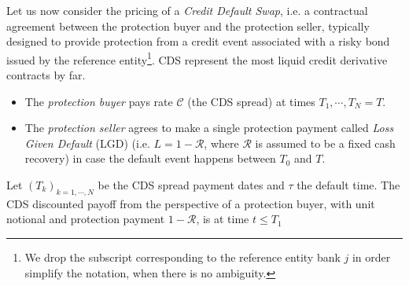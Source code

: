 \documentclass[12pt,a4paper]{article}
\theoremstyle{plain}
\numberwithin{equation}{section}
\begin{document}
Let us now consider the pricing of a  \emph{Credit Default Swap}, i.e.  a contractual agreement between the protection buyer and the protection seller, typically designed to provide protection from a credit event associated with a risky bond issued by the reference entity\footnote{We drop the subscript corresponding to the  reference entity  bank $j$ in order simplify the notation, when there is no ambiguity.}. CDS represent the most liquid credit derivative contracts by far.

\begin{itemize}
\item The \emph{protection buyer} pays rate $\mathcal{C}$ (the CDS spread) at times $T_{1}, \cdots,T_N=T$.
\item The \emph{protection seller} agrees to make a single protection payment called \emph{Loss Given Default} (LGD) (i.e. $L=1-\mathcal{R}$, where $\mathcal{R}$ is assumed to be a fixed cash recovery) in case the default event happens between $T_{0}$ and $T$.
\end{itemize}
Let $(T_k)_{k=1,\cdots, N}$ be the CDS spread payment dates and $\tau$ the default time. The  CDS discounted payoff from the perspective of a protection buyer, with unit notional and protection payment $1-\mathcal{R}$, is at time $t\leq T_1$
\end{document}
